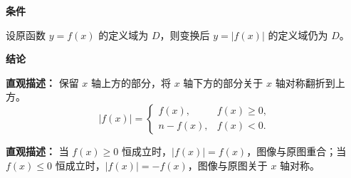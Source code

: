 \begin{statementbox}
	\textbf{\textcolor{CStatement}{条件}}
	\begin{description}[style=nextline, leftmargin=2.8em, labelsep=0.5em, itemsep=0.35em]
		\item[\textbf{\textcolor{CStatement}{条件1（定义域前提）：}}] 设原函数 $y=f(x)$ 的定义域为 $D$，则变换后 $y=|f(x)|$ 的定义域仍为 $D$。
	\end{description}
	\textbf{\textcolor{CStatement}{结论}}
	\begin{description}[style=nextline, leftmargin=2.8em, labelsep=0.5em, itemsep=0.45em]
		\item[\textbf{\textcolor{CStatement}{结论一（翻折规则）：}}]
			\textbf{\textcolor{CStatement}{直观描述：}}
			保留 $x$ 轴上方的部分，将 $x$ 轴下方的部分关于 $x$ 轴对称翻折到上方。
			\[
				|f(x)| = \begin{cases}
				f(x), & f(x)\ge0,\\n    -f(x), & f(x)<0.
		\end{cases}
		\]
	\item[\textbf{\textcolor{CStatement}{推广结论（特殊情形）：}}]
		\textbf{\textcolor{CStatement}{直观描述：}}
		当 $f(x)\ge0$ 恒成立时，$|f(x)|=f(x)$，图像与原图重合；当 $f(x)\le0$ 恒成立时，$|f(x)|=-f(x)$，图像与原图关于 $x$ 轴对称。
\end{description}
\end{statementbox}
